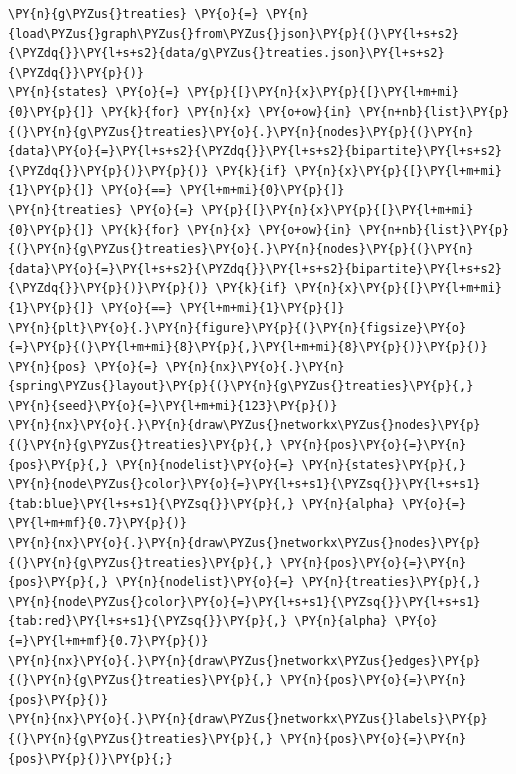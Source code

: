     \begin{tcolorbox}[breakable, size=fbox, boxrule=1pt, pad at break*=1mm,colback=cellbackground, colframe=cellborder]
\begin{Verbatim}[commandchars=\\\{\}]
\PY{n}{g\PYZus{}treaties} \PY{o}{=} \PY{n}{load\PYZus{}graph\PYZus{}from\PYZus{}json}\PY{p}{(}\PY{l+s+s2}{\PYZdq{}}\PY{l+s+s2}{data/g\PYZus{}treaties.json}\PY{l+s+s2}{\PYZdq{}}\PY{p}{)}
\PY{n}{states} \PY{o}{=} \PY{p}{[}\PY{n}{x}\PY{p}{[}\PY{l+m+mi}{0}\PY{p}{]} \PY{k}{for} \PY{n}{x} \PY{o+ow}{in} \PY{n+nb}{list}\PY{p}{(}\PY{n}{g\PYZus{}treaties}\PY{o}{.}\PY{n}{nodes}\PY{p}{(}\PY{n}{data}\PY{o}{=}\PY{l+s+s2}{\PYZdq{}}\PY{l+s+s2}{bipartite}\PY{l+s+s2}{\PYZdq{}}\PY{p}{)}\PY{p}{)} \PY{k}{if} \PY{n}{x}\PY{p}{[}\PY{l+m+mi}{1}\PY{p}{]} \PY{o}{==} \PY{l+m+mi}{0}\PY{p}{]}
\PY{n}{treaties} \PY{o}{=} \PY{p}{[}\PY{n}{x}\PY{p}{[}\PY{l+m+mi}{0}\PY{p}{]} \PY{k}{for} \PY{n}{x} \PY{o+ow}{in} \PY{n+nb}{list}\PY{p}{(}\PY{n}{g\PYZus{}treaties}\PY{o}{.}\PY{n}{nodes}\PY{p}{(}\PY{n}{data}\PY{o}{=}\PY{l+s+s2}{\PYZdq{}}\PY{l+s+s2}{bipartite}\PY{l+s+s2}{\PYZdq{}}\PY{p}{)}\PY{p}{)} \PY{k}{if} \PY{n}{x}\PY{p}{[}\PY{l+m+mi}{1}\PY{p}{]} \PY{o}{==} \PY{l+m+mi}{1}\PY{p}{]}
\PY{n}{plt}\PY{o}{.}\PY{n}{figure}\PY{p}{(}\PY{n}{figsize}\PY{o}{=}\PY{p}{(}\PY{l+m+mi}{8}\PY{p}{,}\PY{l+m+mi}{8}\PY{p}{)}\PY{p}{)}
\PY{n}{pos} \PY{o}{=} \PY{n}{nx}\PY{o}{.}\PY{n}{spring\PYZus{}layout}\PY{p}{(}\PY{n}{g\PYZus{}treaties}\PY{p}{,} \PY{n}{seed}\PY{o}{=}\PY{l+m+mi}{123}\PY{p}{)}
\PY{n}{nx}\PY{o}{.}\PY{n}{draw\PYZus{}networkx\PYZus{}nodes}\PY{p}{(}\PY{n}{g\PYZus{}treaties}\PY{p}{,} \PY{n}{pos}\PY{o}{=}\PY{n}{pos}\PY{p}{,} \PY{n}{nodelist}\PY{o}{=} \PY{n}{states}\PY{p}{,} \PY{n}{node\PYZus{}color}\PY{o}{=}\PY{l+s+s1}{\PYZsq{}}\PY{l+s+s1}{tab:blue}\PY{l+s+s1}{\PYZsq{}}\PY{p}{,} \PY{n}{alpha} \PY{o}{=} \PY{l+m+mf}{0.7}\PY{p}{)}
\PY{n}{nx}\PY{o}{.}\PY{n}{draw\PYZus{}networkx\PYZus{}nodes}\PY{p}{(}\PY{n}{g\PYZus{}treaties}\PY{p}{,} \PY{n}{pos}\PY{o}{=}\PY{n}{pos}\PY{p}{,} \PY{n}{nodelist}\PY{o}{=} \PY{n}{treaties}\PY{p}{,} \PY{n}{node\PYZus{}color}\PY{o}{=}\PY{l+s+s1}{\PYZsq{}}\PY{l+s+s1}{tab:red}\PY{l+s+s1}{\PYZsq{}}\PY{p}{,} \PY{n}{alpha} \PY{o}{=}\PY{l+m+mf}{0.7}\PY{p}{)}
\PY{n}{nx}\PY{o}{.}\PY{n}{draw\PYZus{}networkx\PYZus{}edges}\PY{p}{(}\PY{n}{g\PYZus{}treaties}\PY{p}{,} \PY{n}{pos}\PY{o}{=}\PY{n}{pos}\PY{p}{)}
\PY{n}{nx}\PY{o}{.}\PY{n}{draw\PYZus{}networkx\PYZus{}labels}\PY{p}{(}\PY{n}{g\PYZus{}treaties}\PY{p}{,} \PY{n}{pos}\PY{o}{=}\PY{n}{pos}\PY{p}{)}\PY{p}{;}
\end{Verbatim}
\end{tcolorbox}

